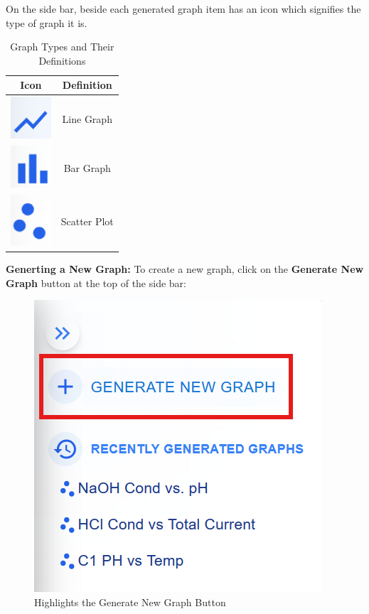 \documentclass[12pt]{article}
\begin{document}
On the side bar, beside each generated graph item has an icon which signifies
the type of graph it is. 
\begin{table}[H]
    \centering
    \begin{tabular}{|c|c|}
        \hline
         \textbf{Icon} & \textbf{Definition} \\
        \hline
        \includegraphics[width=1.5cm]{Images/graph-line.png} & Line Graph \\
        \hline
        \includegraphics[width=1.5cm]{Images/graph-bar.png} & Bar Graph \\
        \hline
        \includegraphics[width=1.5cm]{Images/graph-scatter.png} & Scatter Plot \\
        \hline
    \end{tabular}
    \caption{Graph Types and Their Definitions}
    \label{tab:graphs}
\end{table}

\noindent \textbf{Generting a New Graph:} \newline
To create a new graph, click on the \textbf{Generate New Graph} button at the top of the side bar:
\begin{figure}[H]
    \centering
    \includegraphics[scale=1]{Images/graph-newgraph .png}
    \caption{Highlights the Generate New Graph Button}
    \label{fig:example}
\end{figure}
\end{document}

